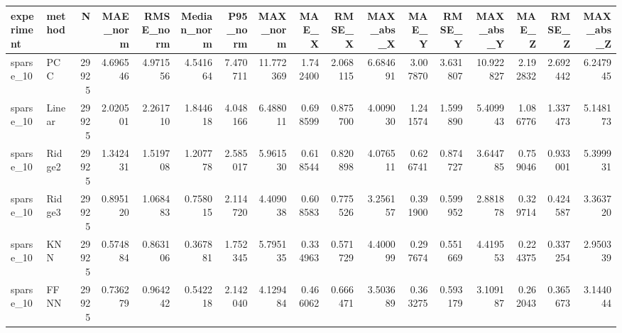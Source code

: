 \begin{tabular}{llrrrrrrrrrrrrrrr}
\toprule
experiment & method & N & MAE_norm & RMSE_norm & Median_norm & P95_norm & MAX_norm & MAE_X & RMSE_X & MAX_abs_X & MAE_Y & RMSE_Y & MAX_abs_Y & MAE_Z & RMSE_Z & MAX_abs_Z \\
\midrule
sparse_10 & PCC & 29925 & 4.696546 & 4.971556 & 4.541664 & 7.470711 & 11.772369 & 1.742400 & 2.068115 & 6.684691 & 3.007870 & 3.631807 & 10.922827 & 2.192832 & 2.692442 & 6.247945 \\
sparse_10 & Linear & 29925 & 2.020501 & 2.261710 & 1.844618 & 4.048166 & 6.488011 & 0.698599 & 0.875700 & 4.009030 & 1.241574 & 1.599890 & 5.409943 & 1.086776 & 1.337473 & 5.148173 \\
sparse_10 & Ridge2 & 29925 & 1.342431 & 1.519708 & 1.207778 & 2.585017 & 5.961530 & 0.618544 & 0.820898 & 4.076511 & 0.626741 & 0.874727 & 3.644785 & 0.759046 & 0.933001 & 5.399931 \\
sparse_10 & Ridge3 & 29925 & 0.895120 & 1.068483 & 0.758015 & 2.114720 & 4.409038 & 0.608583 & 0.775526 & 3.256157 & 0.391900 & 0.599952 & 2.881878 & 0.329714 & 0.424587 & 3.363720 \\
sparse_10 & KNN & 29925 & 0.574884 & 0.863106 & 0.367881 & 1.752345 & 5.795135 & 0.334963 & 0.571729 & 4.400099 & 0.297674 & 0.551669 & 4.419553 & 0.224375 & 0.337254 & 2.950339 \\
sparse_10 & FFNN & 29925 & 0.736279 & 0.964242 & 0.542218 & 2.142040 & 4.129484 & 0.466062 & 0.666471 & 3.503689 & 0.363275 & 0.593179 & 3.109187 & 0.262043 & 0.365673 & 3.144044 \\
\bottomrule
\end{tabular}
